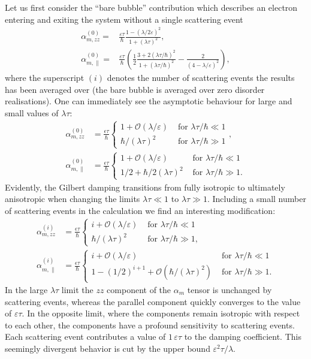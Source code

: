 Let us first consider the ``bare bubble'' contribution which describes an electron entering and exiting the system without a single scattering event
\begin{align}
    \alpha_{m,zz}^{(0)} = &\frac{\varepsilon\tau}{\hbar} \frac{1-(\lambda/2\varepsilon)^2}{1+(\lambda\tau)^2},\\
    \alpha_{m,\parallel}^{(0)} = &\frac{\varepsilon\tau}{\hbar}\left(\frac{1}{2}\frac{3+2(\lambda\tau/\hbar)^2}{1+(\lambda\tau/\hbar)^2}-\frac{2}{(4-\lambda/\varepsilon)^2}\right),
\end{align}
where the superscript $(i)$ denotes the number of scattering events the results has been averaged over (the bare bubble is averaged over zero disorder realisations). One can immediately see the asymptotic behaviour for large and small values of $\lambda\tau$:
\begin{align}
    \alpha_{m,zz}^{(0)} &= \frac{\epsilon\tau}{\hbar}\begin{cases}
    1  +\mathcal{O}(\lambda/\varepsilon) &\text{ for }\lambda\tau/\hbar\ll1\\
    \hbar/(\lambda\tau)^2&\text{ for }\lambda\tau/\hbar\gg1
    \end{cases},\\
    \alpha_{m,\parallel}^{(0)} &= \frac{\epsilon\tau}{\hbar}\begin{cases}
    1  +\mathcal{O}(\lambda/\varepsilon) &\text{ for }\lambda\tau/\hbar\ll1\\
    1/2 + \hbar/2(\lambda\tau)^2&\text{ for }\lambda\tau/\hbar\gg1.
    \end{cases}
\end{align}
Evidently, the Gilbert damping transitions from fully isotropic to ultimately anisotropic when changing the limits $\lambda\tau\ll1$ to $\lambda\tau\gg1$. 
Including a small number of scattering events in the calculation we find an interesting modification:
\begin{align}
    \alpha_{m,zz}^{(i)} &= \frac{\epsilon\tau}{\hbar}\begin{cases}
    i + \mathcal{O}(\lambda/\varepsilon) &\text{ for }\lambda\tau/\hbar\ll1\\
    \hbar/(\lambda\tau)^2&\text{ for }\lambda\tau/\hbar\gg1,
    \end{cases}\\
    \alpha_{m,\parallel}^{(i)} & = \frac{\epsilon\tau}{\hbar}\begin{cases}
    i + \mathcal{O}(\lambda/\varepsilon) &\text{ for }\lambda\tau/\hbar\ll1\\
    1-(1/2)^{i+1}+\mathcal{O}(\hbar/(\lambda\tau)^2)&\text{ for }\lambda\tau/\hbar\gg1.
    \end{cases}
\end{align}
In the large $\lambda\tau$ limit the $zz$ component of the $\alpha_m$ tensor is unchanged by scattering events, whereas the parallel component quickly converges to the value of $\varepsilon\tau$. In the opposite limit, where the components remain isotropic with respect to each other, the components have a profound sensitivity to scattering events. Each scattering event contributes a value of $1\,\varepsilon\tau$ to the damping coefficient. This seemingly divergent behavior is cut by the upper bound $\varepsilon^2\tau/\lambda$. 

